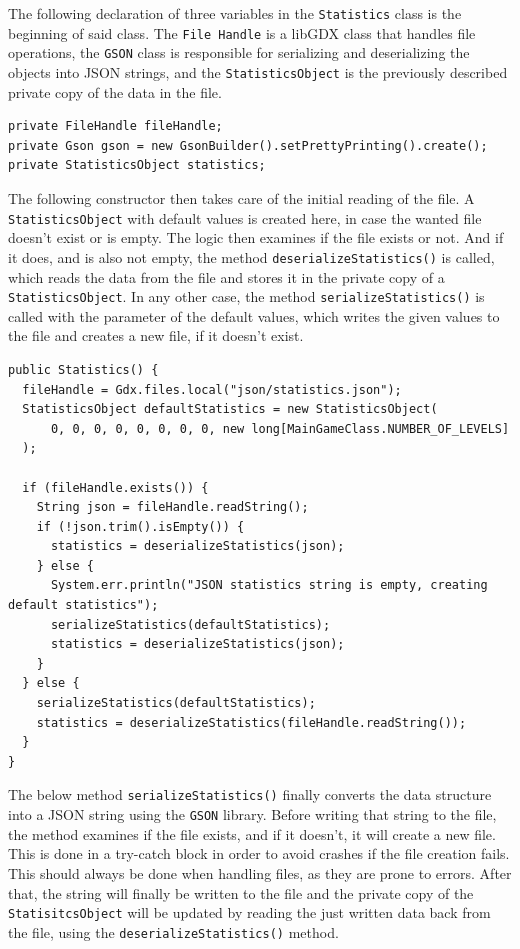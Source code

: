 \documentclass[12p]{article}
\begin{document}
The following declaration of three variables in the \texttt{Statistics} class is the beginning of said class. The \texttt{File Handle} is a libGDX class that handles file operations, the \texttt{GSON} class is responsible for serializing and deserializing the objects into JSON strings, and the \texttt{StatisticsObject} is the previously described private copy of the data in the file.

\begin{verbatim}
private FileHandle fileHandle;
private Gson gson = new GsonBuilder().setPrettyPrinting().create();
private StatisticsObject statistics;
\end{verbatim}

The following constructor then takes care of the initial reading of the file. A \texttt{StatisticsObject} with default values is created here, in case the wanted file doesn't exist or is empty. The logic then examines if the file exists or not. And if it does, and is also not empty, the method \texttt{deserializeStatistics()} is called, which reads the data from the file and stores it in the private copy of a \texttt{StatisticsObject}. In any other case, the method \texttt{serializeStatistics()} is called with the parameter of the default values, which writes the given values to the file and creates a new file, if it doesn't exist.

\begin{verbatim}
public Statistics() {
  fileHandle = Gdx.files.local("json/statistics.json");
  StatisticsObject defaultStatistics = new StatisticsObject(
      0, 0, 0, 0, 0, 0, 0, 0, new long[MainGameClass.NUMBER_OF_LEVELS]
  );

  if (fileHandle.exists()) {
    String json = fileHandle.readString();
    if (!json.trim().isEmpty()) {
      statistics = deserializeStatistics(json);
    } else {
      System.err.println("JSON statistics string is empty, creating default statistics");
      serializeStatistics(defaultStatistics);
      statistics = deserializeStatistics(json);
    }
  } else {
    serializeStatistics(defaultStatistics);
    statistics = deserializeStatistics(fileHandle.readString());
  }
}
\end{verbatim}

The below method \texttt{serializeStatistics()} finally converts the data structure into a JSON string using the \texttt{GSON} library. Before writing that string to the file, the method examines if the file exists, and if it doesn't, it will create a new file. This is done in a try-catch block in order to avoid crashes if the file creation fails. This should always be done when handling files, as they are prone to errors. After that, the string will finally be written to the file and the private copy of the \texttt{StatisitcsObject} will be updated by reading the just written data back from the file, using the \texttt{deserializeStatistics()} method.
\end{document}
